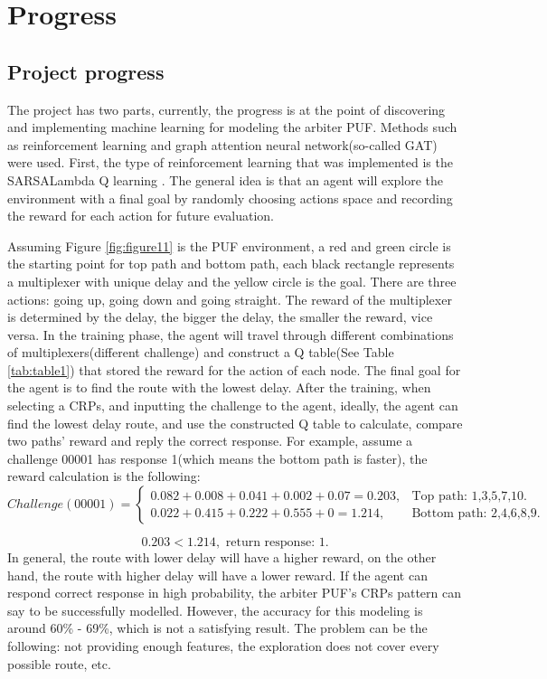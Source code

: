 \chapter{Progress}

\section{Project progress}
The project has two parts, currently, the progress is at the point of discovering and implementing machine learning for modeling the arbiter PUF. Methods such as reinforcement learning
and graph attention neural network(so-called GAT) were used. First, the type of reinforcement learning that was implemented is the SARSALambda Q learning \cite{Reference9}. The general idea is that an agent will 
explore the environment with a final goal by randomly choosing actions space and recording the reward for each action for future evaluation. 

Assuming Figure \ref{fig:figure11} is the PUF environment, a red and green circle is the starting point for top path and bottom path, each black rectangle represents a multiplexer with unique delay and the yellow 
circle is the goal. There are three actions: going up, going down and going straight. The reward of the multiplexer is determined by the delay, the bigger the delay, the smaller the reward, vice versa. In the training phase, 
the agent will travel through different combinations of multiplexers(different challenge) and construct a Q table(See Table \ref{tab:table1}) that stored the reward for the action of each node. The final goal for the agent is to find the route with 
the lowest delay. After the training, when selecting a CRPs, and inputting the challenge to the agent, ideally, the agent can find the lowest delay route, and use the constructed Q table to calculate, compare two paths' reward and reply the correct response. For example, assume 
a challenge 00001 has response 1(which means the bottom path is faster), the reward calculation is the following:
\begin{equation}
    Challenge(00001) =\begin{cases}
    0.082+0.008+0.041+0.002+0.07 = 0.203, & \text {Top path: 1,3,5,7,10}.\\
    0.022+0.415+0.222+0.555+0 = 1.214, & \text {Bottom path: 2,4,6,8,9}.
    \end{cases}
\end{equation}

\begin{equation}
    0.203 < 1.214, \text { return response: 1}.
\end{equation}
In general, the route with lower delay will have a higher reward, on the other hand, the route with higher delay will have a lower reward. If the agent can respond correct response in high probability, the arbiter PUF's CRPs pattern can say to 
be successfully modelled. However, the accuracy for this modeling is around 60\% - 69\%, which is not a satisfying result. The problem can be the following: not providing enough features, the exploration does not 
cover every possible route, etc.

